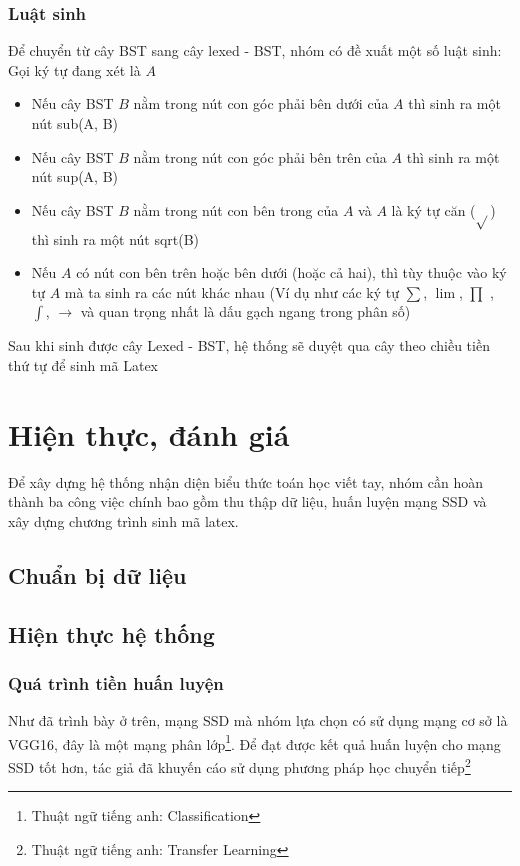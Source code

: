 \documentclass[a4paper,12pt]{article}
\begin{document}
	\subsubsection*{Luật sinh}
	

	Để chuyển từ cây BST sang cây lexed - BST, nhóm có đề xuất một số luật sinh: \\
	Gọi ký tự đang xét là $A$
	\begin{itemize}
		\item Nếu cây BST $B$ nằm trong nút con góc phải bên dưới của $A$ thì sinh ra một nút sub(A, B)
		\item Nếu cây BST $B$ nằm trong nút con góc phải bên trên của $A$ thì sinh ra một nút sup(A, B)
		\item Nếu cây BST $B$ nằm trong nút con bên trong của $A$ và $A$ là ký tự căn ($\sqrt{}$) thì sinh ra một nút sqrt(B)
		\item Nếu $A$ có nút con bên trên hoặc bên dưới (hoặc cả hai), thì tùy thuộc vào ký tự $A$ mà ta sinh ra các nút khác nhau (Ví dụ như các ký tự $\sum$, $\lim$, $\prod$ , $\int$, $\rightarrow$ và quan trọng nhất là dấu gạch ngang trong phân số)
		
	\end{itemize}
	
	Sau khi sinh được cây Lexed - BST, hệ thống sẽ duyệt qua cây theo chiều tiền thứ tự để sinh mã Latex
	
	
	\section{Hiện thực, đánh giá}
	
	Để xây dựng hệ thống nhận diện biểu thức toán học viết tay, nhóm cần hoàn thành ba công việc chính bao gồm thu thập dữ liệu, huấn luyện mạng SSD và xây dựng chương trình sinh mã latex.
	
	\subsection{Chuẩn bị dữ liệu}
	
	\subsection{Hiện thực hệ thống}
	
	\subsubsection{Quá trình tiền huấn luyện}
	Như đã trình bày ở trên, mạng SSD mà nhóm lựa chọn có sử dụng mạng cơ sở là VGG16, đây là một mạng phân lớp\footnote{Thuật ngữ tiếng anh: Classification}. Để đạt được kết quả huấn luyện cho mạng SSD tốt hơn, tác giả đã khuyến cáo sử dụng phương pháp học chuyển tiếp\footnote{Thuật ngữ tiếng anh: Transfer Learning}
	
\end{document}
